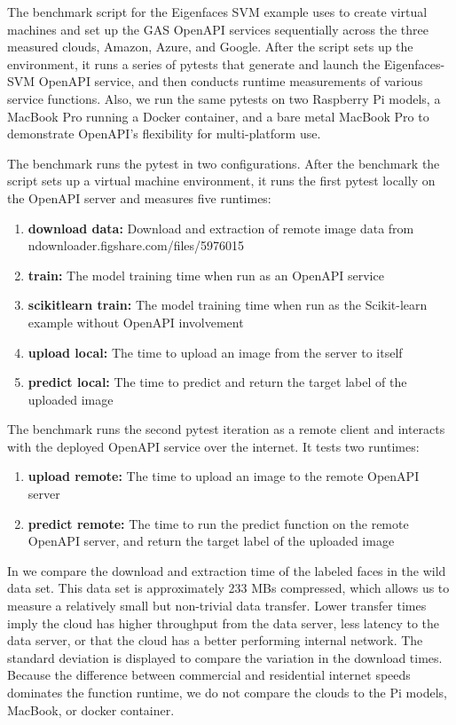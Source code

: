 The benchmark script for the Eigenfaces SVM example uses \Cloudmesh to
create virtual machines and set up the GAS OpenAPI services
sequentially across the three measured clouds, Amazon, Azure, and
Google. After the script sets up the environment, it runs a series of
pytests that generate and launch the Eigenfaces-SVM OpenAPI service,
and then conducts runtime measurements of various service
functions. Also, we run the same pytests on two Raspberry Pi models, a
MacBook Pro running a Docker container, and a bare metal MacBook Pro
to demonstrate \Cloudmesh OpenAPI's flexibility for multi-platform
use.

The benchmark runs the pytest in two configurations. After the benchmark
the script sets up a virtual machine environment, it runs the first pytest
locally on the OpenAPI server and measures five runtimes:

\begin{enumerate}
\def\labelenumi{\arabic{enumi}.}
\item \textbf{download data:} Download and extraction of remote image data from
  ndownloader.figshare.com/files/5976015
\item \textbf{train:} 
  The model training time when run as an OpenAPI service
\item \textbf{scikitlearn train:} 
  The model training time when run as the Scikit-learn example without
  OpenAPI involvement
\item \textbf{upload local:} 
  The time to upload an image from the server to itself
\item \textbf{predict local:} 
  The time to predict and return the target label of the uploaded image
\end{enumerate}

The benchmark runs the second pytest iteration as a remote client and
interacts with the deployed OpenAPI service over the internet. It
tests two runtimes:

\begin{enumerate}
\def\labelenumi{\arabic{enumi}.}
\item \textbf{upload remote:} 
  The time to upload an image to the remote OpenAPI server
\item \textbf{predict remote:} 
  The time to run the predict function on the remote OpenAPI server, and
  return the target label of the uploaded image
\end{enumerate}

In  we compare the download and extraction time
of the labeled faces in the wild data set. This data set is
approximately 233 MBs compressed, which allows us to measure a
relatively small but non-trivial data transfer.  Lower transfer times
imply the cloud has higher throughput from the data server, less
latency to the data server, or that the cloud has a better performing
internal network. The standard deviation is displayed to compare the
variation in the download times. Because the difference between
commercial and residential internet speeds dominates the function
runtime, we do not compare the clouds to the Pi models, MacBook, or
docker container.

